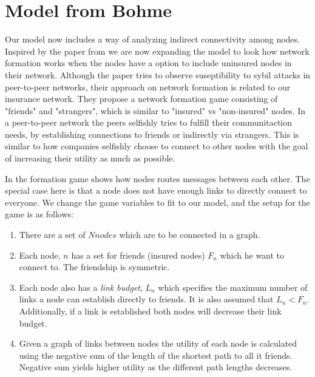\chapter{Model from Bohme}


Our model now includes a way of analyzing indirect connectivity among nodes. Inspired by the paper from \cite{danezis2006network} we are now expanding the model to look how network formation works when the nodes have a option to include uninsured nodes in their network. Although the paper tries to observe suseptibility to sybil attacks in peer-to-peer networks, their approach on network formation is related to our insurance network. They propose a network formation game consisting of "friends" and "strangers", which is similar to "insured" vs "non-insured" nodes. 
In a peer-to-peer network the peers selfishly tries to fulfill their communitaction needs, by establishing connections to friends or indirectly via strangers. This is similar to how companies selfishly choose to connect to other nodes with the goal of increasing their utility as much as possible. 

In \cite{danezis2006network} the formation game shows how nodes routes messages between each other. The special case here is that a node does not have enough links to directly connect to everyone. We change the game variables to fit to our model, and the setup for the game is as follows:

\begin{enumerate}

\item There are a set of $N nodes$ which are to be connected in a graph.
\item Each node, $n$ has a set for friends (insured nodes) $F_{n}$ which he want to connect to. The friendship is symmetric.
\item Each node also has a \textit{link budget}, $L_{n}$ which specifies the maximum number of links a node can establish directly to friends. It is also assumed that $L_{n}<F_{n}$. Additionally, if a link is established both nodes will decrease their link budget.
\item Given a graph of links between nodes the utility of each node is calculated using the negative sum of the length of the shortest path to all it friends. Negative sum yields higher utility as the different path lengths decreases.
\end{enumerate}

